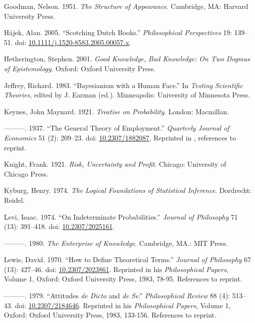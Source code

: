 \documentclass[
  11pt,
  letterpaper,
  DIV=11,
  numbers=noendperiod,
  twoside]{scrartcl}
\newlength{\cslhangindent}
\newenvironment{CSLReferences}[2] %
 {\begin{list}{}{%
  \setlength{\itemindent}{0pt}
  \setlength{\leftmargin}{0pt}
  \setlength{\parsep}{0pt}
  \ifodd #1
   \setlength{\leftmargin}{\cslhangindent}
   \setlength{\itemindent}{-1\cslhangindent}
  \fi
  \setlength{\itemsep}{#2\baselineskip}}}
 {\end{list}}
\begin{document}
\begin{CSLReferences}{1}{0}
Goodman, Nelson. 1951. \emph{The Structure of Appearance}. Cambridge,
MA: Harvard University Press.

Hájek, Alan. 2005. {``Scotching Dutch Books.''} \emph{Philosophical
Perspectives} 19: 139--51. doi:
\href{https://doi.org/10.1111/j.1520-8583.2005.00057.x}{10.1111/j.1520-8583.2005.00057.x}.

Hetherington, Stephen. 2001. \emph{Good Knowledge, Bad Knowledge: On Two
Dogmas of Epistemology}. Oxford: Oxford University Press.

Jeffrey, Richard. 1983. {``Bayesianism with a Human Face.''} In
\emph{Testing Scientific Theories}, edited by J. Earman (ed.).
Minneapolis: University of Minnesota Press.

Keynes, John Maynard. 1921. \emph{Treatise on Probability}. London:
Macmillan.

---------. 1937. {``The General Theory of Employment.''} \emph{Quarterly
Journal of Economics} 51 (2): 209--23. doi:
\href{https://doi.org/10.2307/1882087}{10.2307/1882087}. Reprinted in
\cite[XIV 109-123]{KeynesCW}, references to reprint.

Knight, Frank. 1921. \emph{Risk, Uncertainty and Profit}. Chicago:
University of Chicago Press.

Kyburg, Henry. 1974. \emph{The Logical Foundations of Statistical
Inference}. Dordrecht: Reidel.

Levi, Isaac. 1974. {``On Indeterminate Probabilities.''} \emph{Journal
of Philosophy} 71 (13): 391--418. doi:
\href{https://doi.org/10.2307/2025161}{10.2307/2025161}.

---------. 1980. \emph{The Enterprise of Knowledge}. Cambridge, MA.: MIT
Press.

Lewis, David. 1970. {``How to Define Theoretical Terms.''} \emph{Journal
of Philosophy} 67 (13): 427--46. doi:
\href{https://doi.org/10.2307/2023861}{10.2307/2023861}. Reprinted in
his \emph{Philosophical Papers}, Volume 1, Oxford: Oxford University
Press, 1983, 78-95. References to reprint.

---------. 1979. {``Attitudes \emph{de Dicto} and \emph{de Se}.''}
\emph{Philosophical Review} 88 (4): 513--43. doi:
\href{https://doi.org/10.2307/2184646}{10.2307/2184646}. Reprinted in
his \emph{Philosophical Papers}, Volume 1, Oxford: Oxford University
Press, 1983, 133-156. References to reprint.


\end{CSLReferences}
\end{document}
